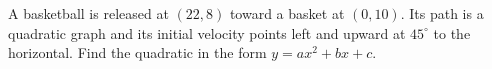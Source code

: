 A basketball is released at $(22,8)$ toward a basket at $(0,10)$. Its path is a quadratic graph and its initial velocity points left and upward at $45^\circ$ to the horizontal. Find the quadratic in the form $y=ax^2+bx+c$.
